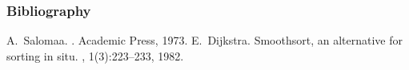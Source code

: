 \documentclass[hyperref=unicode]{beamer}
\begin{document}
\begin{frame}
\frametitle{Bibliography}
\begin{thebibliography}{Dijkstra, 1982}
A.~Salomaa.
.
\newblock Academic Press, 1973.
E.~Dijkstra.
\newblock Smoothsort, an alternative for sorting in situ.
, 1(3):223--233, 1982.
\end{thebibliography}
\end{frame}
\end{document}

